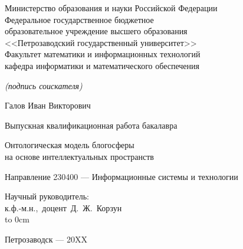 \documentclass[a4paper,12pt]{report}
\begin{document}

\thispagestyle{empty}
{ \large
\begin{center}
\renewcommand{\baselinestretch}{1.4}
Министерство образования и науки Российской Федерации\\
Федеральное государственное бюджетное\\
образовательное учреждение высшего образования\\
<<Петрозаводский государственный университет>>\\
Факультет математики и информационных технологий \\
кафедра информатики и математического обеспечения \\

\end{center}
\vspace{3\bigskipamount}%

\begin{flushright}
\itshape\footnotesize
(подпись соискателя)\\
\end{flushright}

\vspace{3\bigskipamount}

\begin{center}
\large
Галов Иван Викторович
\end{center}
\medskip%

\begin{center}
\large
Выпускная квалификационная работа бакалавра
\end{center}
\medskip%

\begin{center}
\renewcommand{\baselinestretch}{1.2}
\Large
Онтологическая модель блогосферы\\
на основе интеллектуальных пространств
\end{center}
\medskip%

\begin{center}
\large
Направление 230400 --- Информационные системы и технологии
\end{center}

\vspace{4\bigskipamount}%

\begin{flushright}
\parbox{8cm}{%
\renewcommand{\baselinestretch}{1.2}
\large
Научный руководитель:\\
к.ф.-м.н.,~доцент~Д.~Ж.~Корзун
\\
\hspace*{3cm}\hbox to 0cm{\raisebox{-1em}{\itshape\footnotesize(подпись руководителя)}}\hspace*{-1cm}\hrulefill\hspace*{1cm}
}
\end{flushright}

\vspace{3\bigskipamount}%

\begin{center}
\large
Петрозаводск --- 20XX
\end{center}
}
\end{document}
